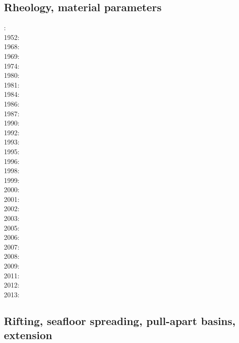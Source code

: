 \subsection*{Rheology, material parameters}

: \cite{druc51}\cite{hafn51}\\
1952: \cite{drpr52}\\
1968: \cite{byer68}\\
1969: \cite{hand69}\\
1974: \cite{kogo74}\\
1980: \cite{brko80}\\
1981: \cite{delo81}\\
1984: \cite{rafi84}\cite{chpa84}\\
1986: \cite{kapf86}\\
1987: \cite{kikr87}\\
1990: \cite{wica90}\\
1992: \cite{bako92}\cite{chbo92}\cite{kali92}\cite{kohl92}\\
1993: \cite{kawu93}\\
1995: \cite{koem95}\\
1996: \cite{wasd96}\\
1998: \cite{copo98}\\
1999: \cite{kayk99}\\
2000: \cite{rydr00}\cite{rana00}\\
2001: \cite{lova01}\\
2002: \cite{hirt02}\\
2003: \cite{hiko03}\cite{kaju03}\\
2005: \cite{didr05}\cite{drur05}\\
2006: \cite{rygw06}\cite{buwa06}\\
2007: \cite{hirw07}\cite{kohl07}\\
2008: \cite{lemm08}\cite{budr08}\cite{koka08}\\
2009: \cite{kayk09}\cite{kako09}\\
2011: \cite{lell11}\cite{kemk11}\\
2012: \cite{reyn12}\\
2013: \cite{lepo13}


\subsection*{Rifting, seafloor spreading, pull-apart basins, extension}

